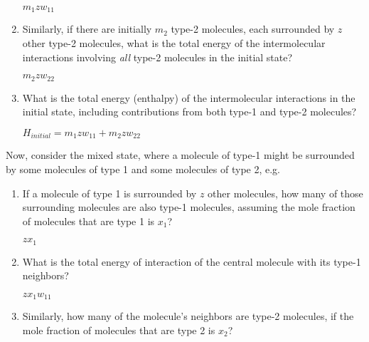 \begin{activity}
\begin{ctqs}
\begin{enumerate}
					\begin{solution}[0.75in]
						$m_1 z w_{11}$
					\end{solution}
		
				\item Similarly, if there are initially $m_2$ type-2 molecules, each surrounded by $z$ other type-2 molecules, what is the total energy of the intermolecular interactions involving \emph{all} type-2 molecules in the initial state?
				
					\begin{solution}[0.75in]
						$m_2 z w_{22}$
					\end{solution}
		
				\item What is the total energy (enthalpy) of the intermolecular interactions in the initial state, including contributions from both type-1 and type-2 molecules? \label{ctq:Hinitial}
				
					\begin{solution}[0.75in]
						$H_{initial} = m_1 z w_{11} + m_2 z w_{22}$
					\end{solution}
			\end{enumerate}
		
		\question Now, consider the mixed state, where a molecule of type-1 might be surrounded by some molecules of type 1 and some molecules of type 2, e.g.
		
			\begin{enumerate}
				\item If a molecule of type 1 is surrounded by $z$ other molecules, how many of those surrounding molecules are also type-1 molecules, assuming the mole fraction of molecules that are type 1 is $x_1$?
				
					\begin{solution}[0.75in]
						$z x_1$
					\end{solution}
				
				\item What is the total energy of interaction of the central molecule with its type-1 neighbors?
				
					\begin{solution}[0.75in]
						$z x_1 w_{11}$
					\end{solution}
				
				\item Similarly, how many of the molecule's neighbors are type-2 molecules, if the mole fraction of molecules that are type 2 is $x_2$?
				

\end{enumerate}
\end{ctqs}
\end{activity}
